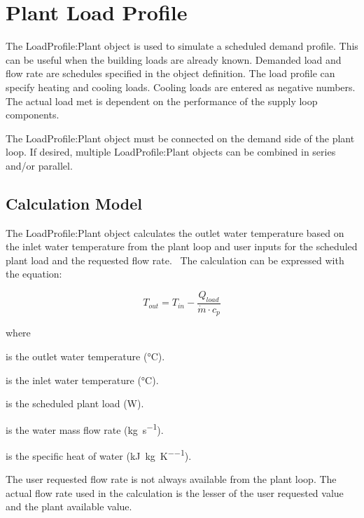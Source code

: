 \section{Plant Load Profile}\label{plant-load-profile}

The LoadProfile:Plant object is used to simulate a scheduled demand profile. This can be useful when the building loads are already known. Demanded load and flow rate are schedules specified in the object definition. The load profile can specify heating and cooling loads. Cooling loads are entered as negative numbers. The actual load met is dependent on the performance of the supply loop components.

The LoadProfile:Plant object must be connected on the demand side of the plant loop. If desired, multiple LoadProfile:Plant objects can be combined in series and/or parallel.

\subsection{Calculation Model}\label{calculation-model}

The LoadProfile:Plant object calculates the outlet water temperature based on the inlet water temperature from the plant loop and user inputs for the scheduled plant load and the requested flow rate.~ The calculation can be expressed with the equation:

\begin{equation}
T_{out} = T_{in} - \frac{Q_{load}}{\dot{m} \cdot c_p}
\end{equation}

\noindent where
\begin{description}[labelwidth=1cm, leftmargin=!]
\item[$T_{out}$] is the outlet water temperature (\si{\celsius}).
\item[$T_{in}$] is the inlet water temperature (\si{\celsius}).
\item[$Q_{load}$] is the scheduled plant load (\si{\W}).
\item[$\dot{m}$] is the water mass flow rate (\si{\kg\per\s}).
\item[$c_p$] is the specific heat of water (\si{\kJ\per\kg\per\K}).
\end{description}

The user requested flow rate is not always available from the plant loop. The actual flow rate used in the calculation is the lesser of the user requested value and the plant available value.


